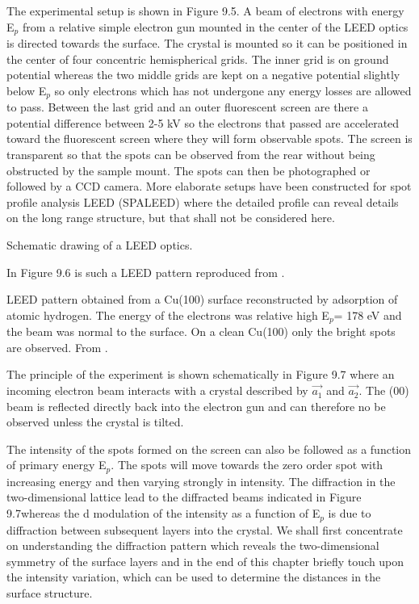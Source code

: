 The experimental setup is shown in Figure 9.5.  A beam of electrons with energy E$_p$ from a relative simple electron gun mounted in the center of the LEED optics is directed towards the surface. The crystal is mounted so it can be positioned in the center of four concentric hemispherical grids. The inner grid is on ground potential whereas the two middle grids are kept on a negative potential slightly below  E$_p$ so only electrons which has not undergone any energy losses are allowed to pass. Between the last grid and an outer fluorescent screen are there a potential difference between 2-5 kV so the electrons that passed are accelerated toward the fluorescent screen where they will form observable spots. The screen is  transparent so that the spots can be observed from the rear without being obstructed by the sample mount. The spots can then be photographed or followed by a CCD camera. More elaborate setups have been constructed for spot profile analysis LEED (SPALEED) where the detailed profile can reveal details on the long range structure, but that shall not be considered here.

\vspace*{11cm}

 Schematic drawing of a LEED optics.

 \noindent In Figure 9.6 is such a LEED pattern reproduced from \cite{HonCu}.


\vspace*{11cm}

 LEED pattern obtained from a Cu(100) surface reconstructed by adsorption of atomic hydrogen. The  energy of the electrons was relative high E$_p$= 178 eV and the beam was  normal to the surface. On a clean Cu(100) only the bright spots are observed. From \cite{HonCu}.
\vspace{1cm}

The principle of the experiment is shown schematically in Figure 9.7 where an incoming electron beam interacts with a crystal described by $\overrightarrow{a_1}$ and $\overrightarrow{a_2}$. The (00) beam is reflected directly back into the electron gun and can therefore no be observed unless  the crystal is tilted.



 The intensity of the spots formed on the screen can also be followed as a function of primary energy E$_p$. The spots will move towards the zero order spot with increasing energy and then varying strongly in intensity. The diffraction in the two-dimensional lattice lead to the diffracted beams indicated in Figure 9.7whereas the d modulation of the intensity as a function of E$_p$ is due to diffraction between subsequent layers into the crystal. We shall first concentrate on understanding the diffraction pattern which reveals the two-dimensional symmetry of the surface layers and in the end of this chapter  briefly touch upon the intensity variation, which can be used to determine the distances in the surface structure.

